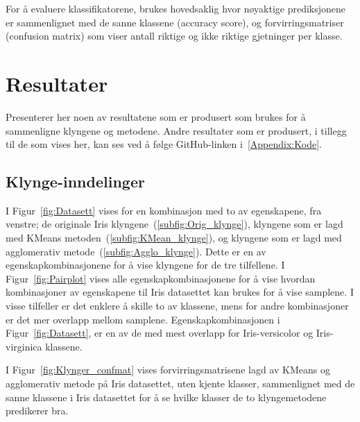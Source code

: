 \documentclass[twocolumn,norwegian]{article}
\begin{document}
	For å evaluere klassifikatorene, brukes hovedsaklig hvor nøyaktige prediksjonene er sammenlignet med de sanne klassene (accuracy score), og forvirringsmatriser (confusion matrix) som viser antall riktige og ikke riktige gjetninger per klasse.
	
	
	\section{Resultater}
	Presenterer her noen av resultatene som er produsert som brukes for å sammenligne klyngene og metodene. Andre resultater som er produsert, i tillegg til de som vises her, kan ses ved å følge GitHub-linken i~\ref{Appendix:Kode}.
	
	
	\subsection{Klynge-inndelinger}
	I Figur~\ref{fig:Datasett} vises for en kombinasjon med to av egenskapene, fra venstre; de originale Iris klyngene~(\ref{subfig:Orig_klynge}), klyngene som er lagd med KMeans metoden~(\ref{subfig:KMean_klynge}), og klyngene som er lagd med agglomerativ metode~(\ref{subfig:Agglo_klynge}). Dette er en av egenskapkombinasjonene for å vise klyngene for de tre tilfellene. I Figur~\ref{fig:Pairplot} vises alle egenskapkombinasjonene for å vise hvordan kombinasjoner av egenskapene til Iris datasettet kan brukes for å vise samplene. I visse tilfeller er det enklere å skille to av klassene, mens for andre kombinasjoner er det mer overlapp mellom samplene. Egenskapkombinasjonen i Figur~\ref{fig:Datasett}, er en av de med mest overlapp for Iris-versicolor og Iris-virginica klassene.
	
	I Figur~\ref{fig:Klynger_confmat} vises forvirringsmatrisene lagd av KMeans og agglomerativ metode på Iris datasettet, uten kjente klasser, sammenlignet med de sanne klassene i Iris datasettet for å se hvilke klasser de to klyngemetodene predikerer bra.
	
\end{document}
